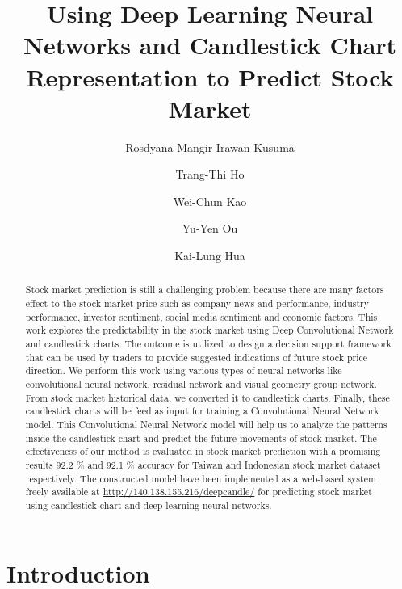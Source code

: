 \documentclass[10pt,twocolumn]{article}
\begin{document}
\title{Using Deep Learning Neural Networks and Candlestick Chart Representation to Predict Stock Market}



\author[1]{Rosdyana Mangir Irawan Kusuma}
\author[2]{Trang-Thi Ho}
\author[3]{Wei-Chun Kao}
\author[1]{Yu-Yen Ou}
\author[2]{Kai-Lung Hua}
\renewcommand\Authands{ and }

\maketitle

\thispagestyle{empty}

\begin{abstract}Stock market prediction is still a challenging problem because there are many factors effect to the stock market price such as company news and performance, industry performance, investor sentiment, social media sentiment and economic factors. This work explores the predictability in the stock market using Deep Convolutional Network and candlestick charts. The outcome is utilized to design a decision support framework that can be used by traders to provide suggested indications of future stock price direction. We perform this work using various types of neural networks like convolutional neural network, residual network and visual geometry group network. From stock market historical data, we converted it to candlestick charts. Finally, these candlestick charts will be feed as input for training a Convolutional Neural Network model. This Convolutional Neural Network model will help us to analyze the patterns inside the candlestick chart and predict the future movements of stock market. The effectiveness of our method is evaluated in stock market prediction with a promising results 92.2 \% and 92.1 \% accuracy for Taiwan and Indonesian stock market dataset respectively. The constructed model have been implemented as a web-based system freely available at \url{http://140.138.155.216/deepcandle/} for predicting stock market using candlestick chart and deep learning neural networks.
\end{abstract}


\section{Introduction}
\end{document}
